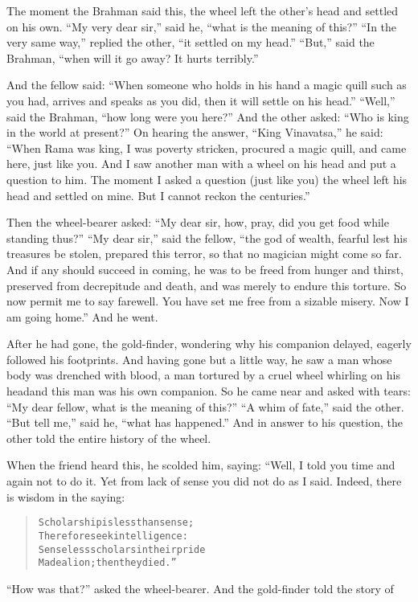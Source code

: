 \documentclass[article, twoside, 14pt]{memoir}
\renewenvironment{verbatim}{%
\begin{quote}%
\vskip -10pt%
\begin{alltt}\normalfont\large}{\end{alltt}%
\end{quote}%
\vskip -10pt
} %
\begin{document}
The moment the Brahman said this, the wheel left the other's head
and settled on his own. ``My very dear sir,'' said he,
``what is the meaning of this?'' ``In the very same way,'' replied
the other, ``it settled on my head.'' ``But,'' said the Brahman,
``when will it go away? It hurts terribly.''

And the fellow said:
``When someone who holds in his hand a magic quill such as you had, arrives and speaks as you did, then it will settle on his head.''
``Well,'' said the Brahman, ``how long were you here?'' And the
other asked: ``Who is king in the world at present?'' On hearing
the answer, ``King Vinavatsa,'' he said:
``When Rama was king, I was poverty stricken, procured a magic quill, and came here, just like you. And I saw another man with a wheel on his head and put a question to him. The moment I asked a question (just like you) the wheel left his head and settled on mine. But I cannot reckon the centuries.''

Then the wheel-bearer asked:
``My dear sir, how, pray, did you get food while standing thus?''
``My dear sir,'' said the fellow,
``the god of wealth, fearful lest his treasures be stolen, prepared this terror, so that no magician might come so far. And if any should succeed in coming, he was to be freed from hunger and thirst, preserved from decrepitude and death, and was merely to endure this torture. So now permit me to say farewell. You have set me free from a sizable misery. Now I am going home.''
And he went.

After he had gone, the gold-finder, wondering why his companion
delayed, eagerly followed his footprints. And having gone but a
little way, he saw a man whose body was drenched with blood, a man
 tortured by a cruel wheel whirling on his head{\textemdash}and this man
was his own companion. So he came near and asked with tears:
``My dear fellow, what is the meaning of this?''
``A whim of fate,'' said the other. ``But tell me,'' said he,
``what has happened.'' And in answer to his question, the other
told the entire history of the wheel.

When the friend heard this, he scolded him, saying: “Well, I told
you time and again not to do it. Yet from lack of sense you did not
do as I said. Indeed, there is wisdom in the saying:

\begin{verbatim}
Scholarship is less than sense;
Therefore seek intelligence:
Senseless scholars in their pride
Made a lion; then they died.”
\end{verbatim}
``How was that?'' asked the wheel-bearer. And the gold-finder told
the story of
\end{document}
